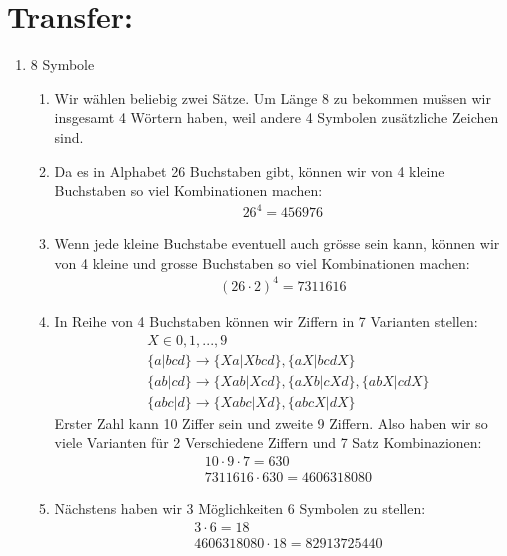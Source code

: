 	\section*{Transfer:}
	\begin{enumerate}[label=(\alph*)]
		\item 8 Symbole
		\begin{enumerate}[label=\bfseries Schritt \arabic*:]
			\item Wir w\"ahlen beliebig zwei S\"atze. Um L\"ange 8 zu bekommen mu\"ssen wir insgesamt 4 W\"ortern haben,
			weil andere 4 Symbolen zus\"atzliche Zeichen sind.

			\item Da es in Alphabet 26 Buchstaben gibt, k\"onnen wir von 4 kleine Buchstaben so viel Kombinationen machen:
			\begin{align*}
				26^4=456976
			\end{align*}

			\item Wenn jede kleine Buchstabe eventuell auch gr\"osse sein kann, k\"onnen wir von 4 kleine und grosse Buchstaben so viel Kombinationen machen:
			\begin{align*}
				(26\cdot2)^4=7311616
			\end{align*}

			\item In Reihe von 4 Buchstaben k\"onnen wir Ziffern in 7 Varianten stellen:
			\begin{align*}
				& X \in {0,1,...,9} \\
				& \{a|bcd\} \to \{Xa|Xbcd\},\{aX|bcdX\} \\
				& \{ab|cd\} \to \{Xab|Xcd\},\{aXb|cXd\}, \{abX|cdX\} \\
				& \{abc|d\} \to \{Xabc|Xd\},\{abcX|dX\}
			\end{align*}
			Erster Zahl kann 10 Ziffer sein und zweite 9 Ziffern. Also haben wir so viele Varianten f\"ur 2 Verschiedene 
			Ziffern und 7 Satz Kombinazionen:
			\begin{align*}
				& 10\cdot9\cdot7 = 630 \\
				& 7311616\cdot630 = 4606318080
			\end{align*}

			\item N\"achstens haben wir 3 M\"oglichkeiten 6 Symbolen zu stellen:
			\begin{align*}
				& 3\cdot6=18 \\
				& 4606318080\cdot18 = 82913725440
			\end{align*}


\end{enumerate}
\end{enumerate}
